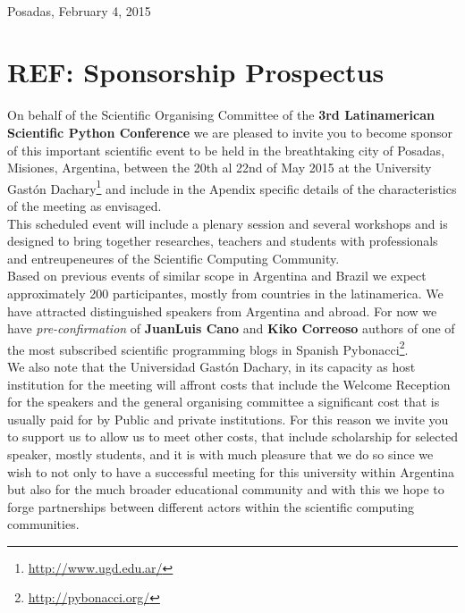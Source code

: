 \documentclass[11pt,a4paper]{report}
\begin{document}
\begin{center}
\end{center}


\hfill \\[0.2cm] Posadas, February 4, 2015\\[0.3cm]

\section*{REF: Sponsorship Prospectus}

On behalf of the Scientific Organising Committee of the
\textbf{3rd Latinamerican Scientific Python Conference} we are pleased to
invite you to become sponsor of this important scientific event to be held in
the breathtaking city of Posadas, Misiones, Argentina, between the
20th al 22nd of May 2015 at the  University Gastón
Dachary\footnote{\url{http://www.ugd.edu.ar/}} and include in the
Apendix specific details of the characteristics of the meeting as
envisaged. \\

This scheduled event will include a plenary session and several
workshops and is designed to bring together researches, teachers and
students with professionals and entreupeneures of the Scientific
Computing Community. \\[0.2cm]

Based on previous events of similar scope in Argentina and Brazil we
expect approximately 200 participantes, mostly from countries in the
latinamerica. We have attracted distinguished speakers from Argentina
and abroad. For now we have \emph{pre-confirmation} of \textbf{JuanLuis Cano}
and \textbf{Kiko Correoso} authors of one of the most
subscribed scientific programming blogs in Spanish
Pybonacci\footnote{\url{http://pybonacci.org/}}.\\[0.2cm]

We also note that the Universidad Gastón Dachary,  in its capacity as
host institution for the meeting will affront costs that include the
Welcome Reception for the speakers and the general organising
committee a significant cost that is usually paid for by Public and
private institutions. For this reason we invite you to support us to
allow us to meet other costs, that include scholarship for selected
speaker, mostly students, and it is with much pleasure that we do so
since we wish to not only to have a successful meeting for this
university within Argentina but also for the much broader educational
community and with this we hope to forge partnerships between
different actors within the scientific computing communities.
\end{document}
